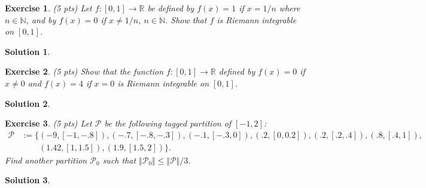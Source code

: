 \documentclass[12pt]{article}
\newcommand{\bR}{\mathbb{R}}
\newcommand{\bN}{\mathbb{N}}
\newcommand{\cP}{\mathcal{P}}
\newcommand{\ra}{\rightarrow}
\theoremstyle{plain}
\newtheorem{exer}{\textbf{Exercise}}}
\theoremstyle{plain}
\newtheorem*{sol}{\textbf{Solution}}}
\begin{document}
\begin{exer}
(5 pts)
Let $f : [0, 1] \ra \bR$ be defined by $f(x) = 1$ if $x = 1/n$ where $n \in \bN$, and by $f(x) = 0$ if $x \neq 1/n$, $n \in \bN$. Show that $f$ is Riemann integrable on $[0, 1]$.
\end{exer}
\begin{sol}

\end{sol}

\begin{exer}
(5 pts)
Show that the function $f : [0, 1] \ra \bR$ defined by $f(x) = 0$ if $x \neq 0$ and $f(x) = 4$ if $x = 0$ is Riemann integrable on $[0, 1]$.
\end{exer}
\begin{sol}
	
\end{sol}

\begin{exer}
(5 pts)
Let $\cP$ be the following tagged partition of $[-1, 2]$:
	\begin{align*}
	\cP &:= \{ (-9, [-1, -.8]) , (-.7, [-.8, -.3]), (-.1, [-.3, 0]), (.2, [0,0.2]), (.2, [.2, .4]), (.8, [.4, 1]), \\
	& \phantom{:= \{} (1.42, [1, 1.5]), (1.9, [1.5, 2]) \} .
	\end{align*}
Find another partition $\cP_0$ such that $\Vert \cP_0 \Vert \leq \Vert \cP \Vert/3$.
\end{exer}
\begin{sol}

\end{sol}
\end{document}
